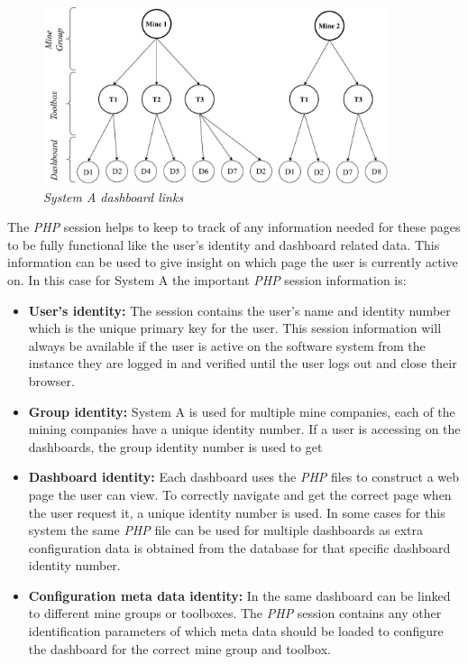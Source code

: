 \begin{figure}[!htb] %
	\centering %
	\includegraphics[width=0.9\textwidth]{Images/Chapter2/SystemA_Dashboard/SystemA_Dashboard.pdf}
	\caption[System A dashboard links]
	{\textit{System A dashboard links}}\label{fig:ch2_SystemA_Dashboard}
\end{figure}

The \emph{PHP} session helps to keep to track of any information needed for these pages to be fully functional like the user's identity and dashboard related data. This information can be used to give insight on which page the user is currently active on. In this case for System A the important \emph{PHP} session information is:

\begin{itemize}
	\item \textbf{User's identity:} The session contains the user's name and identity number which is the unique primary key for the user. This session information will always be available if the user is active on the software system from the instance they are logged in and verified until the user logs out and close their browser.
	\item \textbf{Group identity:} System A is used for multiple mine companies, each of the mining companies have a unique identity number. If a user is accessing on the dashboards, the group identity number is used to get 
	\item \textbf{Dashboard identity:} Each dashboard uses the \emph{PHP} files to construct a web page the user can view. To correctly navigate and get the correct page when the user request it, a unique identity number is used. In some cases for this system the same \emph{PHP} file can be used for multiple dashboards as extra configuration data is obtained from the database for that specific dashboard identity number.
	\item \textbf{Configuration meta data identity:} In  the same dashboard can be linked to different mine groups or toolboxes. The \emph{PHP} session contains any other identification parameters of which meta data should be loaded to configure the dashboard for the correct mine group and toolbox.
\end{itemize}

